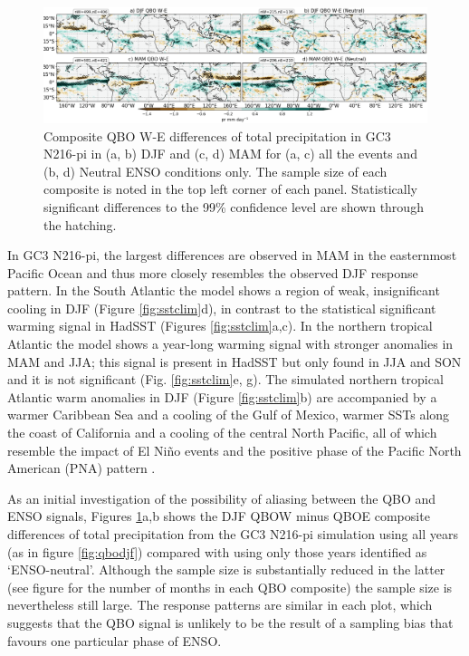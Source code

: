 \begin{figure}[t!]
\centering
 \includegraphics[width=\linewidth]{figures/qbonnpr.png}
\caption[Precipitation response to QBO W-E for GC3 N216-pi under different QBO phases.]{  Composite QBO W-E differences of total precipitation in GC3 N216-pi in (a, b) DJF and (c, d) MAM for (a, c) all the events and (b, d) Neutral ENSO conditions only. The sample size of each composite is noted in the top left corner of each panel. Statistically significant differences to the 99\% confidence level are shown through the hatching. }
\label{fig:qbonn}
\end{figure}

In GC3 N216-pi, the largest differences are observed in MAM in the easternmost Pacific Ocean and thus more closely resembles the observed DJF response pattern. In the South Atlantic the model shows a region of weak, insignificant cooling in DJF (Figure \ref{fig:sstclim}d), in contrast to the statistical significant warming signal in HadSST (Figures \ref{fig:sstclim}a,c). In the northern tropical Atlantic the model shows a year-long warming signal with stronger anomalies in MAM and JJA; this signal is present in HadSST but only found in JJA and SON and it is not significant (Fig. \ref{fig:sstclim}e, g). The simulated northern tropical Atlantic warm anomalies in DJF (Figure \ref{fig:sstclim}b) are accompanied by a warmer Caribbean Sea and a cooling of the Gulf of Mexico, warmer SSTs along the coast of California and a cooling of the central North Pacific, all of which resemble the impact of El Niño events and the positive phase of the Pacific North American (PNA) pattern \citep{deser2010sea,guo2017distinct,jimenezesteve2020}.  

As an initial investigation of the possibility of aliasing between the QBO and ENSO signals, Figures \ref{fig:qbonn}a,b shows the DJF QBOW minus QBOE composite differences of total precipitation from the GC3 N216-pi simulation using all years (as in figure \ref{fig:qbodjf}) compared with using only those years identified as ‘ENSO-neutral’. Although the sample size is substantially reduced in the latter (see figure for the number of months in each QBO composite) the sample size is nevertheless still large. The response patterns are similar in each plot, which suggests that the QBO signal is unlikely to be the result of a sampling bias that favours one particular phase of ENSO.  

